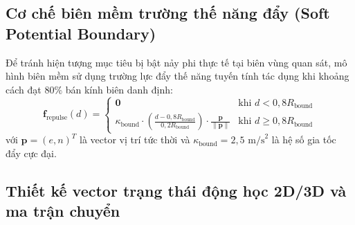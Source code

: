 \subsection{Cơ chế biên mềm trường thế năng đẩy (Soft Potential Boundary)}

\hspace{0.5cm} Để tránh hiện tượng mục tiêu bị bật nảy phi thực tế tại biên vùng quan sát, mô hình biên mềm sử dụng trường lực đẩy thế năng tuyến tính tác dụng khi khoảng cách đạt $80\%$ bán kính biên danh định:
\begin{equation}
\mathbf{f}_{\text{repulse}}(d) = \begin{cases}
\mathbf{0} & \text{khi } d < 0{,}8 R_{\text{bound}} \\
\kappa_{\text{bound}} \cdot \left(\frac{d - 0{,}8 R_{\text{bound}}}{0{,}2 R_{\text{bound}}}\right) \cdot \frac{\mathbf{p}}{\|\mathbf{p}\|} & \text{khi } d \ge 0{,}8 R_{\text{bound}}
\end{cases}
\label{eq:soft-repulsion-formula}
\end{equation}
với $\mathbf{p} = (e, n)^T$ là vector vị trí tức thời và $\kappa_{\text{bound}} = 2{,}5\text{ m/s}^2$ là hệ số gia tốc đẩy cực đại.

\begin{table}[H]
\centering
\caption{So sánh đặc tính quỹ đạo giữa mô hình biên cứng phản xạ và biên mềm thế năng}
\label{tab:boundary-physics-comparison}
\end{table}

\subsection{Thiết kế vector trạng thái động học 2D/3D và ma trận chuyển}

